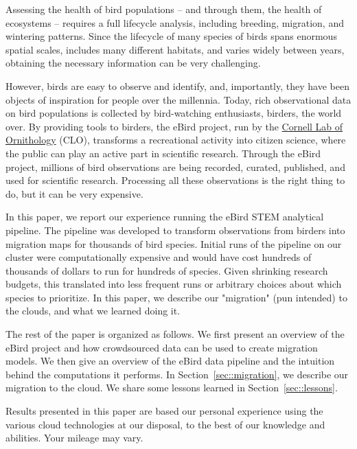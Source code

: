 \documentclass{acm_proc_article-sp}
\begin{document}
Assessing the health of bird populations -- and through them, the health of ecosystems -- requires a full lifecycle analysis, including breeding, migration, and wintering patterns. Since the lifecycle of many species of birds spans enormous spatial scales, includes many different habitats, and varies widely between years, obtaining the necessary information can be very challenging.

However, birds are easy to observe and identify, and, importantly, they have been objects of inspiration for people over the millennia. Today, rich observational data on bird populations is collected by bird-watching enthusiasts, birders, the world over. By providing tools to birders, the eBird project, run by the \href{http://www.birds.cornell.edu/}{Cornell Lab of Ornithology} (CLO), transforms a recreational activity into citizen science, where the public can play an active part in scientific research. Through the eBird project, millions of bird observations are being recorded, curated, published, and used for scientific research. Processing all these observations is the right thing to do, but it can be very expensive.

In this paper, we report our experience running the eBird STEM analytical pipeline. The pipeline was developed to transform observations from birders into migration maps for thousands of bird species. Initial runs of the pipeline on our cluster were computationally expensive and would have cost hundreds of thousands of dollars to run for hundreds of species. Given shrinking research budgets, this translated into less frequent runs or arbitrary choices about which species to prioritize. In this paper, we describe our "migration" (pun intended) to the clouds, and what we learned doing it.

The rest of the paper is organized as follows. We first present an overview of the eBird project and how crowdsourced data can be used to create migration models. We then give an overview of the eBird data pipeline and the intuition behind the computations it performs. In Section~\ref{sec::migration}, we describe our migration to the cloud. We share some lessons learned in Section~\ref{sec::lessons}.

Results presented in this paper are based our personal experience using the various cloud technologies at our disposal, to the best of our knowledge and abilities. Your mileage may vary.
\end{document}
